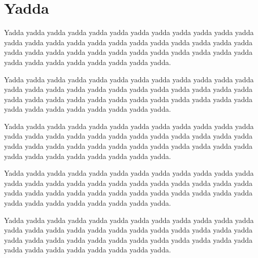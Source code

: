 \section{Yadda
}
\begin{multicols}{2}Yadda yadda yadda yadda yadda yadda yadda yadda yadda yadda yadda
yadda yadda yadda yadda yadda yadda yadda yadda yadda yadda yadda
yadda yadda yadda yadda yadda yadda yadda yadda yadda yadda yadda
yadda yadda yadda yadda yadda yadda yadda yadda yadda yadda yadda.\mktsShowpar\par
Yadda yadda yadda yadda yadda yadda yadda yadda yadda yadda yadda
yadda yadda yadda yadda yadda yadda yadda yadda yadda yadda yadda
yadda yadda yadda yadda yadda yadda yadda yadda yadda yadda yadda
yadda yadda yadda yadda yadda yadda yadda yadda yadda yadda yadda.\mktsShowpar\par
Yadda yadda yadda yadda yadda yadda yadda yadda yadda yadda yadda
yadda yadda yadda yadda yadda yadda yadda yadda yadda yadda yadda
yadda yadda yadda yadda yadda yadda yadda yadda yadda yadda yadda
yadda yadda yadda yadda yadda yadda yadda yadda yadda yadda yadda.\mktsShowpar\par
Yadda yadda yadda yadda yadda yadda yadda yadda yadda yadda yadda
yadda yadda yadda yadda yadda yadda yadda yadda yadda yadda yadda
yadda yadda yadda yadda yadda yadda yadda yadda yadda yadda yadda
yadda yadda yadda yadda yadda yadda yadda yadda yadda yadda yadda.\mktsShowpar\par
Yadda yadda yadda yadda yadda yadda yadda yadda yadda yadda yadda
yadda yadda yadda yadda yadda yadda yadda yadda yadda yadda yadda
yadda yadda yadda yadda yadda yadda yadda yadda yadda yadda yadda
yadda yadda yadda yadda yadda yadda yadda yadda yadda yadda yadda.\mktsShowpar\par
\end{multicols}
